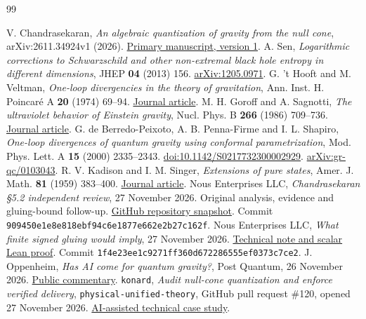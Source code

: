 \documentclass[11pt]{article}
\begin{document}
\clearpage
\begin{thebibliography}{99}\raggedright
{} V. Chandrasekaran, \emph{An algebraic quantization of gravity from the null cone}, arXiv:2611.34924v1 (2026). \href{https://arxiv.org/abs/2611.34924v1}{Primary manuscript, version 1}.
 A. Sen, \emph{Logarithmic corrections to Schwarzschild and other non-extremal black hole entropy in different dimensions}, JHEP \textbf{04} (2013) 156. \href{https://arxiv.org/abs/1205.0971}{arXiv:1205.0971}.
 G. 't Hooft and M. Veltman, \emph{One-loop divergencies in the theory of gravitation}, Ann. Inst. H. Poincar\'e A \textbf{20} (1974) 69--94. \href{https://www.numdam.org/item/AIHPA_1974__20_1_69_0/}{Journal article}.
 M. H. Goroff and A. Sagnotti, \emph{The ultraviolet behavior of Einstein gravity}, Nucl. Phys. B \textbf{266} (1986) 709--736. \href{https://doi.org/10.1016/0550-3213(86)90193-8}{Journal article}.
 G. de Berredo-Peixoto, A. B. Penna-Firme and I. L. Shapiro, \emph{One-loop divergences of quantum gravity using conformal parametrization}, Mod. Phys. Lett. A \textbf{15} (2000) 2335--2343. \href{https://doi.org/10.1142/S0217732300002929}{doi:10.1142/S0217732300002929}. \href{https://arxiv.org/abs/gr-qc/0103043}{arXiv:gr-qc/0103043}.
 R. V. Kadison and I. M. Singer, \emph{Extensions of pure states}, Amer. J. Math. \textbf{81} (1959) 383--400. \href{https://doi.org/10.2307/2372748}{Journal article}.
 Nous Enterprises LLC, \emph{Chandrasekaran \S5.2 independent review}, 27 November 2026. Original analysis, evidence and gluing-bound follow-up. \href{https://github.com/nousentllc/chandrasekaran-section-5-2-review/tree/909450e1e8e818ebf94c6e1877e662e2b27c162f}{GitHub repository snapshot}. Commit \nolinkurl{909450e1e8e818ebf94c6e1877e662e2b27c162f}.
 Nous Enterprises LLC, \emph{What finite signed gluing would imply}, 27 November 2026. \href{https://github.com/nousentllc/chandrasekaran-section-5-2-review/tree/1f4e23ee1c9271ff360d672286555ef0373c7ce2/reviews/v1.5-clarification}{Technical note and scalar Lean proof}. Commit \nolinkurl{1f4e23ee1c9271ff360d672286555ef0373c7ce2}.
 J. Oppenheim, \emph{Has AI come for quantum gravity?}, Post Quantum, 26 November 2026. \href{https://superposer.substack.com/p/has-ai-come-for-quantum-gravity}{Public commentary}.
 \texttt{konard}, \emph{Audit null-cone quantization and enforce verified delivery}, \texttt{physical-unified-theory}, GitHub pull request \#120, opened 27 November 2026. \href{https://github.com/konard/physical-unified-theory/pull/120}{AI-assisted technical case study}.

\end{thebibliography}
\end{document}
